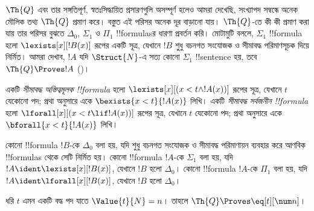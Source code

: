 \documentclass[../../../include/open-logic-section]{subfiles}
\begin{document}

$\Th{Q}$ এবং তার সঙ্গতিপূর্ণ, স্বতঃসিদ্ধায়িত প্রসারণগুলি অসম্পূর্ণ হলেও আমরা
দেখেছি, সংখ্যাপদ সম্বন্ধে অনেক মৌলিক তথ্য $\Th{Q}$ প্রমাণ করে। বস্তুত এই
পরিসর অনেক দূর বাড়ানো যায়। $\Th{Q}$-তে কী কী প্রমাণ করা যায় তার পরিসর
বুঝতে $\Delta_0$, $\Sigma_1$ ও $\Pi_1$ !!{formula}sর ধারণা প্রবর্তন করি।
মোটামুটি বললে, $\Sigma_1$ !!{formula} হলো $\lexists[x][!B(x)]$ রূপের একটি
সূত্র, যেখানে $!B$ শুধু বচনগত সংযোজক ও সীমাবদ্ধ পরিমাণসূচক দিয়ে নির্মিত।
আমরা দেখাব, $!A$ যদি $\Struct{N}$-এ সত্য কোনো $\Sigma_1$ !!{sentence} হয়,
তবে $\Th{Q} \Proves !A$ ()।

\begin{defn}
একটি \emph{সীমাবদ্ধ অস্তিত্বমূলক !!{formula}} হলো
$\lexists[x][(x < t \land !A(x))]$ রূপের সূত্র, যেখানে $t$ যেকোনো পদ; প্রথা
অনুসারে একে $\bexists{x < t}{!A(x)}$ লিখি।
%
একটি \emph{সীমাবদ্ধ সর্বজনীন !!{formula}} হলো
$\lforall[x][(x < t \lif !A(x))]$ রূপের সূত্র, যেখানে $t$ যেকোনো পদ; প্রথা
অনুসারে একে $\bforall{x < t}{!A(x)}$ লিখি।
\end{defn}

\begin{defn}
কোনো !!{formula} $!B$-কে $\Delta_0$ বলা হয়, যদি শুধু বচনগত সংযোজক ও
সীমাবদ্ধ পরিমাণায়ন ব্যবহার করে আণবিক !!{formula}s থেকে সেটি নির্মিত হয়।
%
কোনো !!{formula} $!A$-কে $\Sigma_1$ বলা হয়, যদি
$!A \ident \lexists[x][!B(x)]$, যেখানে $!B$ হলো $\Delta_0$।
%
কোনো !!{formula} $!A$-কে $\Pi_1$ বলা হয়, যদি
$!A \ident \lforall[x][!B(x)]$, যেখানে $!B$ হলো $\Delta_0$।
\end{defn}

\begin{lem}
 ধরি $t$ এমন একটি বদ্ধ পদ যাতে
$\Value{t}{N} = n$। তাহলে $\Th{Q} \Proves \eq[t][\num n]$।
\end{lem}
\end{document}
